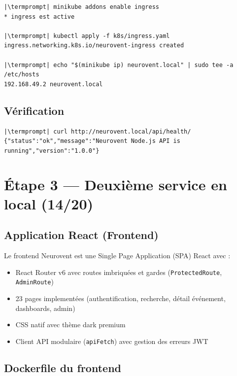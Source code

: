 \documentclass[12pt,a4paper]{article}
\makeatletter
\newcommand{\termprompt}{%
  \textcolor{termgreen}{\textbf{azouaou@Az-zou}}%
  \textcolor{termfg}{:}%
  \textcolor{termcyan}{\textasciitilde/NeuroVent}%
  \textcolor{termfg}{\$}}
\makeatother
\begin{document}
\begin{lstlisting}[style=terminal, caption={Activation de l'addon Ingress dans Minikube}]
|\termprompt| minikube addons enable ingress
* ingress est active

|\termprompt| kubectl apply -f k8s/ingress.yaml
ingress.networking.k8s.io/neurovent-ingress created

|\termprompt| echo "$(minikube ip) neurovent.local" | sudo tee -a /etc/hosts
192.168.49.2 neurovent.local
\end{lstlisting}

\subsection{Vérification}

\begin{lstlisting}[style=terminal, caption={Test de la gateway}]
|\termprompt| curl http://neurovent.local/api/health/
{"status":"ok","message":"Neurovent Node.js API is running","version":"1.0.0"}
\end{lstlisting}

\section{Étape 3 — Deuxième service en local (14/20)}

\subsection{Application React (Frontend)}

Le frontend Neurovent est une Single Page Application (SPA) React avec :
\begin{itemize}
  \item React Router v6 avec routes imbriquées et gardes (\texttt{ProtectedRoute}, \texttt{AdminRoute})
  \item 23 pages implementées (authentification, recherche, détail événement, dashboards, admin)
  \item CSS natif avec thème dark premium
  \item Client API modulaire (\texttt{apiFetch}) avec gestion des erreurs JWT
\end{itemize}

\subsection{Dockerfile du frontend}
\end{document}
